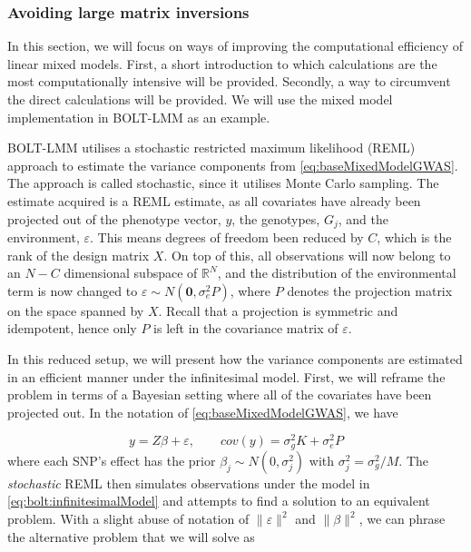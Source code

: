 \subsubsection{Avoiding large matrix inversions}

In this section, we will focus on ways of improving the computational efficiency of linear mixed models. First, a short introduction to which calculations are the most computationally intensive will be provided. Secondly, a way to circumvent the direct calculations will be provided. We will use the mixed model implementation in BOLT-LMM as an example.

BOLT-LMM utilises a stochastic restricted maximum likelihood (REML) approach to estimate the variance components from \cref{eq:baseMixedModelGWAS}. The approach is called stochastic, since it utilises Monte Carlo sampling. The estimate acquired is a REML estimate, as all covariates have already been projected out of the phenotype vector, $ y $, the genotypes, $ G_j $, and the environment, $ \varepsilon $. This means degrees of freedom been reduced by $ C $, which is the rank of the design matrix $ X $. On top of this, all observations will now belong to an $ N-C $ dimensional subspace of $ \mathbb{R}^{N} $, and the distribution of the environmental term is now changed to $ \varepsilon \sim N(\mathbf{0}, \sigma_e^2 P)$, where $ P $ denotes the projection matrix on the space spanned by $ X $. Recall that a projection is symmetric and idempotent, hence only $ P $ is left in the covariance matrix of $ \varepsilon $. 

In this reduced setup, we will present how the variance components are estimated in an efficient manner under the infinitesimal model. First, we will reframe the problem in terms of a Bayesian setting where all of the covariates have been projected out. In the notation of \cref{eq:baseMixedModelGWAS}, we have

\begin{equation}\label{eq:bolt:infinitesimalModel}
y = Z\beta + \varepsilon, \qquad cov(y) = \sigma_g^2 K + \sigma_e^2 P
\end{equation}
where each SNP's effect has the prior $ \beta_j \sim N(0, \sigma_j^2)$ with $\sigma_j^2 = \sigma_g^2 / M $. The \textit{stochastic} REML then simulates observations under the model in \cref{eq:bolt:infinitesimalModel} and attempts to find a solution to an equivalent problem. With a slight abuse of notation of $ \lVert \varepsilon \rVert^2$ and  $ \lVert \beta \rVert^2$, we can phrase the alternative problem that we will solve as

